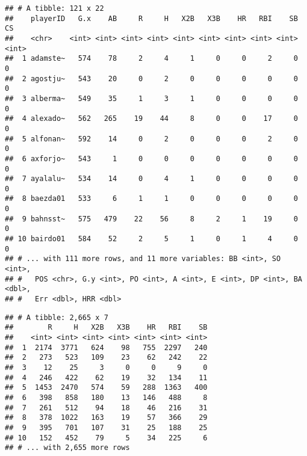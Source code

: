 \documentclass[]{book}
\newenvironment{Shaded}{\begin{snugshade}}{\end{snugshade}}
\newcommand{\KeywordTok}[1]{\textcolor[rgb]{0.13,0.29,0.53}{\textbf{#1}}}
\newcommand{\DecValTok}[1]{\textcolor[rgb]{0.00,0.00,0.81}{#1}}
\newcommand{\StringTok}[1]{\textcolor[rgb]{0.31,0.60,0.02}{#1}}
\newcommand{\OperatorTok}[1]{\textcolor[rgb]{0.81,0.36,0.00}{\textbf{#1}}}
\newcommand{\NormalTok}[1]{#1}
\begin{document}
\begin{verbatim}
## # A tibble: 121 x 22
##    playerID   G.x    AB     R     H   X2B   X3B    HR   RBI    SB    CS
##    <chr>    <int> <int> <int> <int> <int> <int> <int> <int> <int> <int>
##  1 adamste~   574    78     2     4     1     0     0     2     0     0
##  2 agostju~   543    20     0     2     0     0     0     0     0     0
##  3 alberma~   549    35     1     3     1     0     0     0     0     0
##  4 alexado~   562   265    19    44     8     0     0    17     0     0
##  5 alfonan~   592    14     0     2     0     0     0     2     0     0
##  6 axforjo~   543     1     0     0     0     0     0     0     0     0
##  7 ayalalu~   534    14     0     4     1     0     0     0     0     0
##  8 baezda01   533     6     1     1     0     0     0     0     0     0
##  9 bahnsst~   575   479    22    56     8     2     1    19     0     0
## 10 bairdo01   584    52     2     5     1     0     1     4     0     0
## # ... with 111 more rows, and 11 more variables: BB <int>, SO <int>,
## #   POS <chr>, G.y <int>, PO <int>, A <int>, E <int>, DP <int>, BA <dbl>,
## #   Err <dbl>, HRR <dbl>
\end{verbatim}

\begin{Shaded}
\end{Shaded}

\begin{verbatim}
## # A tibble: 2,665 x 7
##        R     H   X2B   X3B    HR   RBI    SB
##    <int> <int> <int> <int> <int> <int> <int>
##  1  2174  3771   624    98   755  2297   240
##  2   273   523   109    23    62   242    22
##  3    12    25     3     0     0     9     0
##  4   246   422    62    19    32   134    11
##  5  1453  2470   574    59   288  1363   400
##  6   398   858   180    13   146   488     8
##  7   261   512    94    18    46   216    31
##  8   378  1022   163    19    57   366    29
##  9   395   701   107    31    25   188    25
## 10   152   452    79     5    34   225     6
## # ... with 2,655 more rows
\end{verbatim}

\begin{Shaded}
\end{Shaded}
\end{document}
